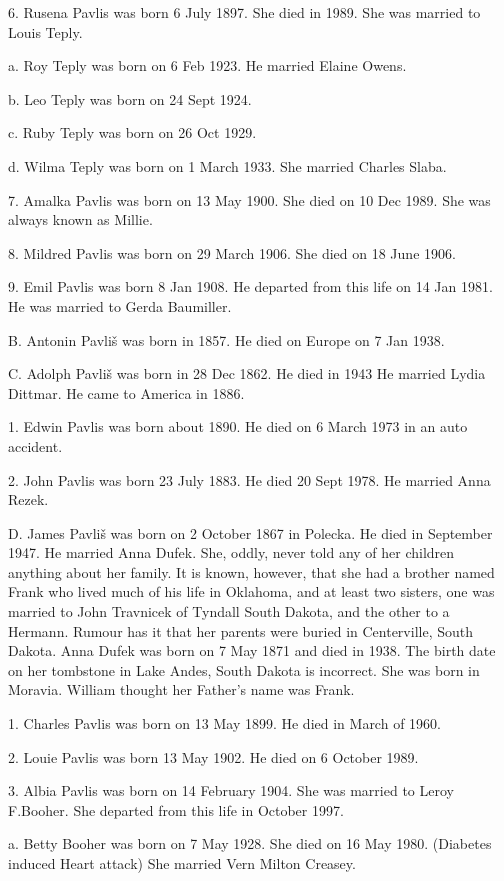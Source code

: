 \documentclass[a4paper]{article}
\begin{document}
6. Rusena Pavlis was born 6 July 1897.  She died in 1989.  She was married to Louis Teply.

a. Roy Teply was born on 6 Feb 1923.  He married Elaine Owens.

b. Leo Teply was born on 24 Sept 1924.  

c. Ruby Teply was born on 26 Oct 1929.

d. Wilma Teply was born on 1 March 1933.  She married Charles Slaba.

7. Amalka Pavlis was born on 13 May 1900.  She died on 10 Dec 1989.  She was always known as Millie.

8. Mildred Pavlis was born on 29 March 1906.  She died on 18 June 1906.

9. Emil Pavlis was born 8 Jan 1908.  He departed from this life on 14 Jan 1981. He was married to Gerda Baumiller.

B. Antonin Pavli\v{s} was born in 1857.  He died on Europe on 7 Jan 1938. 

C. Adolph Pavli\v{s} was born in 28 Dec 1862.  He died in 1943  He married Lydia Dittmar. He came to America in 1886.  

1. Edwin Pavlis was born about 1890.  He died on 6 March 1973 in an auto accident. 

2. John Pavlis was born 23 July 1883.  He died 20 Sept 1978. He married Anna Rezek.

D.  James Pavli\v{s} was born on 2 October 1867 in Polecka.  He died in September 1947.  He married Anna  Dufek.  She, oddly, never told any of her children anything about her family.  It is known, however, that she had a brother named Frank who lived much of his life in Oklahoma, and at least two  sisters, one was married to John Travnicek of Tyndall South Dakota, and the other to a Hermann.  Rumour has it that her parents were buried in Centerville, South Dakota.  Anna Dufek was born on 7 May 1871 and died in 1938. The birth date on her tombstone in Lake Andes, South Dakota is incorrect. She was born in Moravia.  William thought her Father's name was Frank.  

1. Charles Pavlis was born on 13 May 1899.  He died in March of 1960.  

2. Louie Pavlis was born 13 May 1902.  He died on 6 October 1989.

3. Albia Pavlis was born on 14 February 1904.  She was married to Leroy F.Booher. She departed from this life in October 1997.

a. Betty Booher was  born on 7 May 1928.  She died on 16 May 1980. (Diabetes induced  Heart attack)  She married Vern Milton Creasey.
\end{document}
